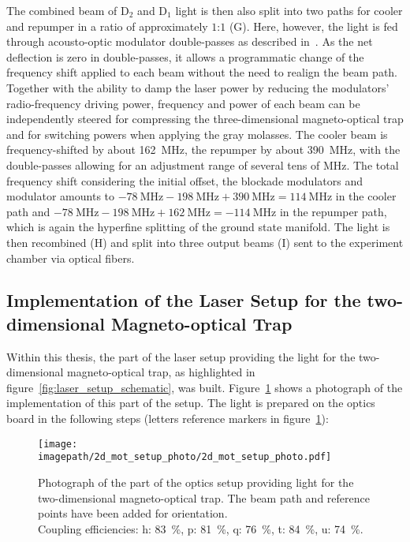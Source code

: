 The combined beam of D$_2$ and D$_1$ light is then also split into two paths for cooler and repumper in a ratio of approximately $1$:$1$ (G). Here, however, the light is fed through acousto-optic modulator double-passes as described in~\cite{qesja_design_2022}. As the net deflection is zero in double-passes, it allows a programmatic change of the frequency shift applied to each beam without the need to realign the beam path. Together with the ability to damp the laser power by reducing the modulators' radio-frequency driving power, frequency and power of each beam can be independently steered for compressing the three-dimensional magneto-optical trap and for switching powers when applying the gray molasses. The cooler beam is frequency-shifted by about \SI{+162}{\mega\hertz}, the repumper by about \SI{+390}{\mega\hertz}, with the double-passes allowing for an adjustment range of several tens of \si{\mega\hertz}. The total frequency shift considering the initial offset, the blockade modulators and modulator amounts to $\SI{-78}{\mega\hertz} - \SI{198}{\mega\hertz} + \SI{390}{\mega\hertz} = \SI{+114}{\mega\hertz}$ in the cooler path and $\SI{-78}{\mega\hertz} - \SI{198}{\mega\hertz} + \SI{162}{\mega\hertz} = \SI{-114}{\mega\hertz}$ in the repumper path, which is again the hyperfine splitting of the ground state manifold. The light is then recombined (H) and split into three output beams (I) sent to the experiment chamber via optical fibers.

\subsection*{Implementation of the Laser Setup for the two-dimensional Magneto-optical Trap}
Within this thesis, the part of the laser setup providing the light for the two-dimensional magneto-optical trap, as highlighted in figure~\ref{fig:laser_setup_schematic}, was built.
Figure~\ref{fig:2d_mot_setup_photo} shows a photograph of the implementation of this part of the setup. The light is prepared on the optics board in the following steps (letters reference markers in figure~\ref{fig:2d_mot_setup_photo}):

\begin{figure}
    \centering
    \texttt{[image: \\imagepath/2d\_mot\_setup\_photo/2d\_mot\_setup\_photo.pdf]}
    \caption{Photograph of the part of the optics setup providing light for the two-dimensional magneto-optical trap. The beam path and reference points have been added for orientation.\\Coupling efficiencies: h: \SI[]{83}{\percent}, p: \SI[]{81}{\percent}, q: \SI[]{76}{\percent}, t: \SI[]{84}{\percent}, u: \SI[]{74}{\percent}.}
    \label{fig:2d_mot_setup_photo}
\end{figure}

